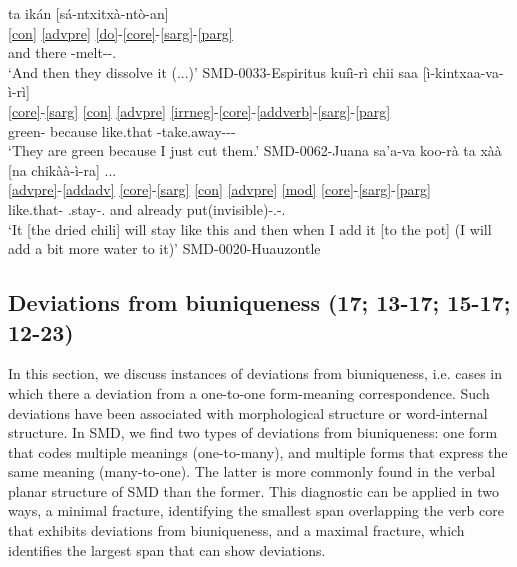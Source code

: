 \documentclass[output=paper]{langscibook}
\begin{document}
\ea 
    \ea \label{ex:freemax1}
	    \glll  ta ikán [sá-ntxitxà-ntò-an] \\
			\ref{con} \ref{advpre} \ref{do}-\ref{core}-\ref{sarg}-\ref{parg} \\
			and there \Caus-melt-\Spl-\Third.\Thing{} \\
	    \glt `And then they dissolve it (...)' \hfill SMD-0033-Espiritus
	\ex \label{ex:freemax2}
	    \glll  kuíì-rì chii saa [ì-kintxaa-va-ì-rì] \\
			\ref{core}-\ref{sarg} \ref{con} \ref{advpre} \ref{irrneg}-\ref{core}-\ref{addverb}-\ref{sarg}-\ref{parg} \\
			green-\Third{} because like.that \Cmpl-take.away-\Add-\Fsg-\Third \\
	    \glt `They are green because I just cut them.' \hfill SMD-0062-Juana
	\ex \label{ex:freemax3}
    \glll  sa'a-va koo-rà ta xàà [na chikàà-ì-ra] ... \\
       \ref{advpre}-\ref{addadv} \ref{core}-\ref{sarg} \ref{con} \ref{advpre} \ref{mod} \ref{core}-\ref{sarg}-\ref{parg} \\
        like.that-\Add{} \Pot.stay-\Tsg.\M{} and already \Mod{} put(invisible)-\Fpl.\Incl-\Tsg.\M{} \\
    \glt `It [the dried chili] will stay like this and then when I add it [to the pot] (I will add a bit more water to it)' \hfill SMD-0020-Huauzontle
    \z
\z



\subsection{Deviations from biuniqueness (17; 13-17; 15-17; 12-23)} %
\label{sub:deviations}

In this section, we discuss instances of deviations from biuniqueness, i.e. cases in which there a deviation from a one-to-one form-meaning correspondence. 
Such deviations have been associated with morphological structure or word-internal structure.
In SMD, we find two types of deviations from biuniqueness: one form that codes multiple meanings (one-to-many), and multiple forms that express the same meaning (many-to-one).
The latter is more commonly found in the verbal planar structure of SMD than the former.
This diagnostic can be applied in two ways, a minimal fracture, identifying the smallest span overlapping the verb core that exhibits deviations from biuniqueness, and a maximal fracture, which identifies the largest span that can show deviations.
\end{document}
